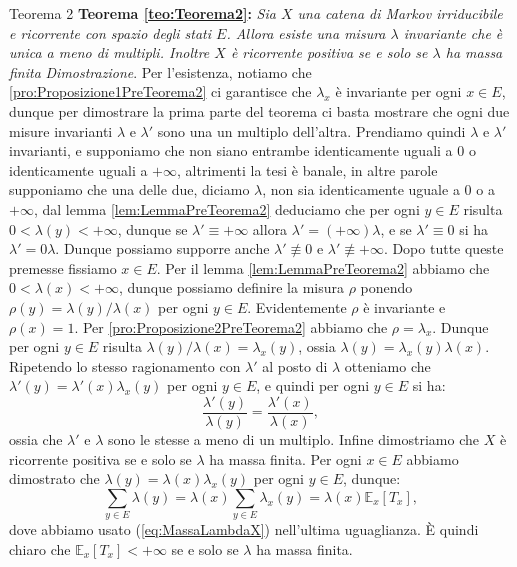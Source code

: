 \documentclass[11pt]{book}
\makeatletter
\theoremstyle{Definizione}
\theoremstyle{TeoremaProposizioneLemmaCorollario}
\theoremstyle{OsservazioneNota}
\renewenvironment{proof}[1][\proofname]{\par
  \normalfont \topsep6\p@\@plus6\p@\relax
  \trivlist
  \item[\hskip\labelsep
        \itshape
    #1\@addpunct{.}]\ignorespaces
}{%
  \endtrivlist\@endpefalse
}
\newcommand{\E}{\mathbb{E}}
\renewenvironment{proof}{\textsl{Dimostrazione}.}{}
\makeatother
\begin{document}
\begin{boxteo}{Teorema 2}
\textbf{Teorema \ref{teo:Teorema2}:} \textsl{Sia $X$ una catena di Markov irriducibile e ricorrente con spazio degli stati $E$. Allora esiste una misura $\lambda$ invariante che è unica a meno di multipli. Inoltre $X$ è ricorrente positiva se e solo se $\lambda$ ha massa finita}
\tcblower
\begin{proof}
Per l'esistenza, notiamo che \ref{pro:Proposizione1PreTeorema2} ci garantisce che $\lambda_x$ è invariante per ogni $x\in E$, dunque per dimostrare la prima parte del teorema ci basta mostrare che ogni due misure invarianti $\lambda$ e $\lambda'$ sono una un multiplo dell'altra. Prendiamo quindi $\lambda$ e $\lambda'$ invarianti, e supponiamo che non siano entrambe identicamente uguali a $0$ o identicamente uguali a $+\infty$, altrimenti la tesi è banale, in altre parole supponiamo che una delle due, diciamo $\lambda$, non sia identicamente uguale a $0$ o a $+\infty$, dal lemma \ref{lem:LemmaPreTeorema2} deduciamo che per ogni $y\in E$ risulta $0 < \lambda(y) < +\infty$, dunque se $\lambda' \equiv +\infty$ allora $\lambda' = (+\infty)\lambda$, e se $\lambda' \equiv 0$ si ha $\lambda' = 0\lambda$. Dunque possiamo supporre anche $\lambda' \not \equiv 0$ e $\lambda' \not \equiv +\infty$. Dopo tutte queste premesse fissiamo $x\in E$. Per il lemma \ref{lem:LemmaPreTeorema2} abbiamo che $0 < \lambda(x) <+\infty$, dunque possiamo definire la misura $\rho$ ponendo $\rho(y) = \lambda(y)/\lambda(x)$ per ogni $y\in E$. Evidentemente $\rho$ è invariante e $\rho(x) = 1$. Per \ref{pro:Proposizione2PreTeorema2} abbiamo che $\rho = \lambda_x$. Dunque per ogni $y\in E$ risulta $\lambda(y)/\lambda(x) = \lambda_x(y)$, ossia $\lambda(y) = \lambda_x(y)\lambda(x)$. Ripetendo lo stesso ragionamento con $\lambda'$ al posto di $\lambda$ otteniamo che $\lambda'(y) = \lambda'(x) \lambda_x(y)$ per ogni $y\in E$, e quindi per ogni $y\in E$ si ha:
$$
\frac{\lambda'(y)}{\lambda(y)} = \frac{\lambda'(x)}{\lambda(x)},
$$
ossia che $\lambda'$ e $\lambda$ sono le stesse a meno di un multiplo. Infine dimostriamo che $X$ è ricorrente positiva se e solo se $\lambda$ ha massa finita. Per ogni $x\in E$ abbiamo dimostrato che $\lambda(y) = \lambda(x)\lambda_x(y)$ per ogni $y\in E$, dunque:
$$
\sum_{y\in E} \lambda(y) = \lambda(x) \sum_{y\in E} \lambda_x(y) = \lambda(x) \E_x[T_x],
$$
dove abbiamo usato (\ref{eq:MassaLambdaX}) nell'ultima uguaglianza. È quindi chiaro che $\E_x[T_x]<+\infty$ se e solo se $\lambda$ ha massa finita.
\end{proof}
\end{boxteo}
\end{document}
